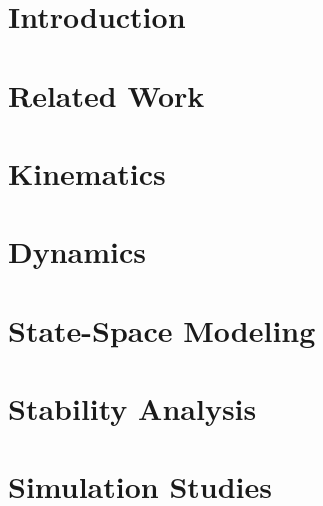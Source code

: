 \documentclass[12pt,a4paper]{report}
\begin{document}


\tableofcontents
\listoffigures
\listoftables
\clearpage


% 

\chapter{Introduction}


\chapter{Related Work}


\chapter{Kinematics}


\chapter{Dynamics}


\chapter{State-Space Modeling}


\chapter{Stability Analysis}



% 

\chapter{Simulation Studies}

\end{document}
